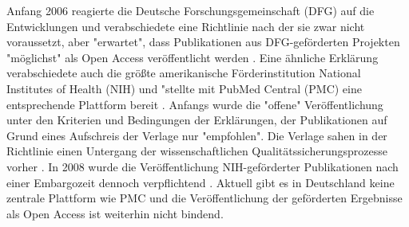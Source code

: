 Anfang 2006 reagierte die Deutsche Forschungsgemeinschaft (DFG) auf die Entwicklungen und verabschiedete eine Richtlinie nach der sie zwar nicht voraussetzt, aber "erwartet", dass Publikationen aus DFG-geförderten Projekten "möglichst" als Open Access veröffentlicht werden \cite{suchen:dfg-richtlinie}. Eine ähnliche Erklärung verabschiedete auch die größte amerikanische Förderinstitution National Institutes of Health (NIH) und "stellte mit PubMed Central (PMC) eine entsprechende Plattform bereit \cite{muller_2010_open}. Anfangs wurde die "offene" Veröffentlichung unter den Kriterien und Bedingungen der Erklärungen, der Publikationen auf Grund eines Aufschreis der Verlage nur "empfohlen". Die Verlage sahen in der Richtlinie einen Untergang der wissenschaftlichen Qualitätssicherungsprozesse vorher \cite{Baggs_2006}. In 2008 wurde die Veröffentlichung NIH-geförderter Publikationen nach einer Embargozeit dennoch verpflichtend \cite{Hanekop_2014}. Aktuell gibt es in Deutschland keine zentrale Plattform wie PMC und die Veröffentlichung der geförderten Ergebnisse als Open Access ist weiterhin nicht bindend.

